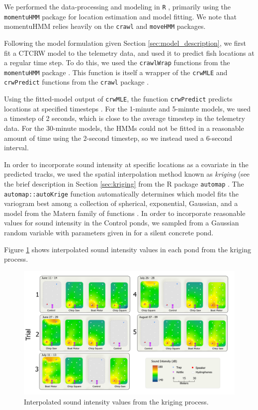 \documentclass[12pt]{article}
\begin{document}
	We performed the data-processing and modeling in \texttt{R} \cite{Rlang2022}, primarily using the \texttt{momentuHMM} package \cite{McClintock2018} for location estimation and model fitting. We note that momentuHMM relies heavily on the \texttt{crawl} \cite{crawl} and \texttt{moveHMM} \cite{Michelot2016} packages.
	
	Following the model formulation given Section \ref{sec:model_description}, we first fit a CTCRW model to the telemetry data, and used it to predict fish locations at a regular time step. To do this, we used the \texttt{crawlWrap} functions from the \texttt{momentuHMM} package \cite{McClintock2018}. This function is itself a wrapper of the \texttt{crwMLE} and \texttt{crwPredict} functions from the \texttt{crawl} package \cite{crawl}.
	
	Using the fitted-model output of \texttt{crwMLE}, the function \texttt{crwPredict} predicts locations at specified timesteps \cite{crawl, Johnson2008}. For the 1-minute and 5-minute models, we used a timestep of 2 seconds, which is close to the average timestep in the telemetry data. For the 30-minute models, the HMMs could not be fitted in a reasonable amount of time using the $2$-second timestep, so we instead used a 6-second interval.
	
	In order to incorporate sound intensity at specific locations as a covariate in the predicted tracks, we used the spatial interpolation method known as \emph{kriging} (see the brief description in Section \ref{sec:kriging} from the R package \texttt{automap} \cite{Hiemstra2008}. The \texttt{automap::autoKrige} function automatically determines which model fits the variogram best among a collection of spherical, exponential, Gaussian, and a model from the Matern family of functions \cite{Hiemstra2008}. In order to incorporate reasonable values for sound intensity in the Control ponds, we sampled from a Gaussian random variable with parameters given in \cite{Wysocki2007} for a silent concrete pond.
	
	Figure \ref{img:intensities} shows interpolated sound intensity values in each pond from the kriging process.
	
	\begin{figure}[H]
		\includegraphics[width=\textwidth]{intensities.png}
		\caption{Interpolated sound intensity values from the kriging process.}
		\label{img:intensities}
	\end{figure}
	
\end{document}
